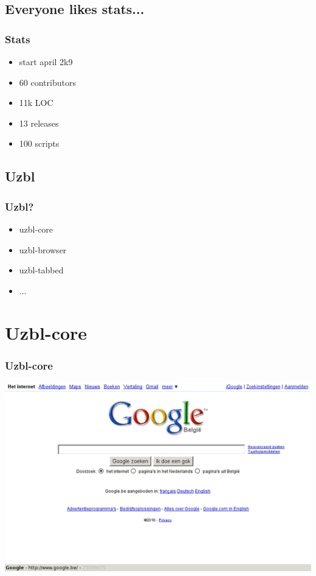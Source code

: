 \documentclass{beamer}
\begin{document}
\subsection{Everyone likes stats...} %
\frame
{
  \frametitle{Stats}

  \begin{itemize}
\large
  \item start april 2k9
  \item 60 contributors %
  \item 11k LOC %
  \item 13 releases %
  \item 100 scripts %
  \end{itemize}
}


\subsection{Uzbl}
\frame
{
\frametitle{Uzbl?}
  \begin{itemize} %
\Large
  \item uzbl-core %
  \item uzbl-browser %
  \item uzbl-tabbed 
  \item ... %
  \end{itemize}
}

\section{Uzbl-core}
\frame
{
\frametitle{Uzbl-core} 
\includegraphics[scale=0.1]{uzbl-core2.png}
}
\end{document}
